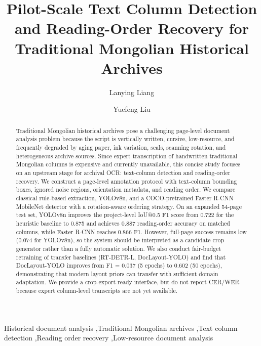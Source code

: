 \documentclass[5p,times,twocolumn]{elsarticle}
\begin{document}
\begin{frontmatter}

\title{Pilot-Scale Text Column Detection and Reading-Order Recovery for Traditional Mongolian Historical Archives}

\author[1]{Lanying Liang}
\author[2]{Yuefeng Liu}
\address[1]{Archives, Inner Mongolia University of Science and Technology, Baotou, 014010, Inner Mongolia, China}
\address[2]{School of Digital and Intelligent Industry (School of Cyber Science and Technology), Inner Mongolia University of Science and Technology, Baotou, 014010, Inner Mongolia, China}

\begin{abstract}
Traditional Mongolian historical archives pose a challenging page-level document analysis problem because the script is vertically written, cursive, low-resource, and frequently degraded by aging paper, ink variation, seals, scanning rotation, and heterogeneous archive sources. Since expert transcription of handwritten traditional Mongolian columns is expensive and currently unavailable, this concise study focuses on an upstream stage for archival OCR: text-column detection and reading-order recovery. We construct a page-level annotation protocol with text-column bounding boxes, ignored noise regions, orientation metadata, and reading order. We compare classical rule-based extraction, YOLOv8n, and a COCO-pretrained Faster R-CNN MobileNet detector with a rotation-aware ordering strategy. On an expanded 54-page test set, YOLOv8n improves the project-level IoU@0.5 F1 score from 0.722 for the heuristic baseline to 0.875 and achieves 0.887 reading-order accuracy on matched columns, while Faster R-CNN reaches 0.866 F1. However, full-page success remains low (0.074 for YOLOv8n), so the system should be interpreted as a candidate crop generator rather than a fully automatic solution. We also conduct fair-budget retraining of transfer baselines (RT-DETR-L, DocLayout-YOLO) and find that DocLayout-YOLO improves from F1 = 0.037 (5 epochs) to 0.602 (50 epochs), demonstrating that modern layout priors can transfer with sufficient domain adaptation. We provide a crop-export-ready interface, but do not report CER/WER because expert column-level transcripts are not yet available.
\end{abstract}

\begin{keyword}
Historical document analysis \sep Traditional Mongolian archives \sep Text column detection \sep Reading order recovery \sep Low-resource document analysis
\end{keyword}

\end{frontmatter}
\end{document}
